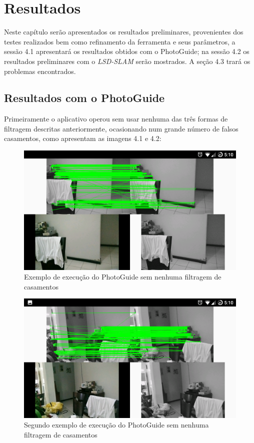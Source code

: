 \chapter{Resultados}

Neste capítulo serão apresentados os resultados preliminares, provenientes dos testes realizados bem como refinamento da ferramenta e seus parâmetros, a sessão 4.1 apresentará os resultados obtidos com o PhotoGuide; na sessão 4.2 os resultados preliminares com o \textit{LSD-SLAM} serão mostrados. A seção 4.3 trará os problemas encontrados.

\section{Resultados com o PhotoGuide}

Primeiramente o aplicativo operou sem usar nenhuma das três formas de filtragem descritas anteriormente, ocasionando num grande número de falsos casamentos, como apresentam as imagens 4.1 e 4.2:

\begin{figure}[!htb]
	\centering
		\includegraphics[width= \textwidth]{Imagens/figura4-1.png}
	\caption{Exemplo de execução do PhotoGuide sem nenhuma filtragem de casamentos}
	\label{fig4:1}
\end{figure}

\begin{figure}[!htb]
	\centering
		\includegraphics[width= \textwidth]{Imagens/figura4-2.png}
	\caption{Segundo exemplo de execução do PhotoGuide sem nenhuma filtragem de casamentos}
	\label{fig4:2}
\end{figure}


